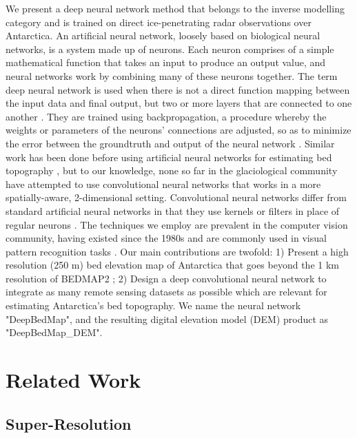 \documentclass[tc, manuscript]{copernicus}
\begin{document}
We present a deep neural network method that belongs to the inverse modelling category and is trained on direct ice-penetrating radar observations over Antarctica.
An artificial neural network, loosely based on biological neural networks, is a system made up of neurons.
Each neuron comprises of a simple mathematical function that takes an input to produce an output value, and neural networks work by combining many of these neurons together.
The term deep neural network is used when there is not a direct function mapping between the input data and final output, but two or more layers that are connected to one another \citep[see][for a review]{LeCunDeeplearning2015}.
They are trained using backpropagation, a procedure whereby the weights or parameters of the neurons' connections are adjusted, so as to minimize the error between the groundtruth and output of the neural network \citep{RumelhartLearningrepresentationsbackpropagating1986}. Similar work has been done before using artificial neural networks for estimating bed topography \citep[e.g.][]{ClarkeNeuralNetworksApplied2009,MonnierInferencebedtopography2018}, but to our knowledge, none so far in the glaciological community have attempted to use convolutional neural networks that works in a more spatially-aware, 2-dimensional setting.
Convolutional neural networks differ from standard artificial neural networks in that they use kernels or filters in place of regular neurons \citep[again, see][for a review]{LeCunDeeplearning2015}.
The techniques we employ are prevalent in the computer vision community, having existed since the 1980s \citep{FukushimaNeocognitronnewalgorithm1982,LeCunBackpropagationAppliedHandwritten1989} and are commonly used in visual pattern recognition tasks \citep[e.g.][]{LecunGradientbasedlearningapplied1998,KrizhevskyImageNetClassificationDeep2012}.
Our main contributions are twofold:
1) Present a high resolution (250 m) bed elevation map of Antarctica that goes beyond the 1 km resolution of BEDMAP2 \citep{FretwellBedmap2improvedice2013};
2) Design a deep convolutional neural network to integrate as many remote sensing datasets as possible which are relevant for estimating Antarctica's bed topography.
We name the neural network "DeepBedMap", and the resulting digital elevation model (DEM) product as "DeepBedMap\_DEM".


\section{Related Work}

\subsection{Super-Resolution} \label{section:superresolution}
\end{document}
